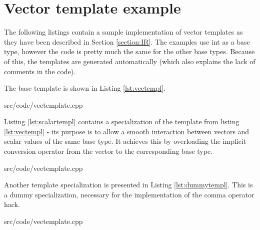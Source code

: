 \chapter{Vector template example}
\label{appendix:vectemplate}

The following listings contain a sample implementation of vector templates as they have been described in Section \ref{section:IR}. The examples use int as a base type, however the code is pretty much the same for the other base types. Because of this, the templates are generated automatically (which also explains the lack of comments in the code).

The base template is shown in Listing \ref{lst:vectempl}.

{src/code/vectemplate.cpp}

Listing \ref{lst:scalartempl} contains a specialization of the template from listing \ref{lst:vectempl} - its purpose is to allow a smooth interaction between vectors and scalar values of the same base type. It achieves this by overloading the implicit conversion operator from the vector to the corresponding base type.

{src/code/vectemplate.cpp}

Another template specialization is presented in Listing \ref{lst:dummytempl}. This is a dummy specialization, necessary for the implementation of the comma operator hack.

{src/code/vectemplate.cpp}